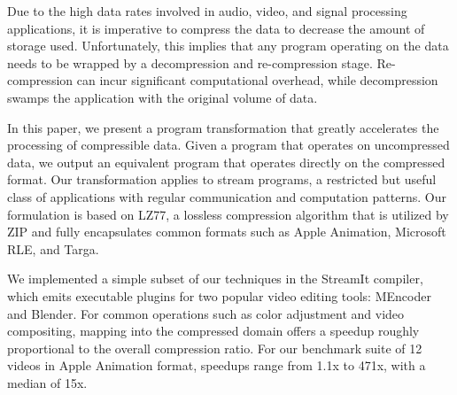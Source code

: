 Due to the high data rates involved in audio, video, and signal
processing applications, it is imperative to compress the data to
decrease the amount of storage used.  Unfortunately, this implies that
any program operating on the data needs to be wrapped by a
decompression and re-compression stage.  Re-compression can incur
significant computational overhead, while decompression swamps the
application with the original volume of data.

In this paper, we present a program transformation that greatly
accelerates the processing of compressible data.  Given a program that
operates on uncompressed data, we output an equivalent program that
operates directly on the compressed format.  Our transformation
applies to stream programs, a restricted but useful class of
applications with regular communication and computation patterns.  Our
formulation is based on LZ77, a lossless compression algorithm that is
utilized by ZIP and fully encapsulates common formats such as Apple
Animation, Microsoft RLE, and Targa.

We implemented a simple subset of our techniques in the StreamIt
compiler, which emits executable plugins for two popular video editing
tools: MEncoder and Blender.  For common operations such as color
adjustment and video compositing, mapping into the compressed domain
offers a speedup roughly proportional to the overall compression
ratio.  For our benchmark suite of 12 videos in Apple Animation
format, speedups range from 1.1x to 471x, with a median of 15x.

